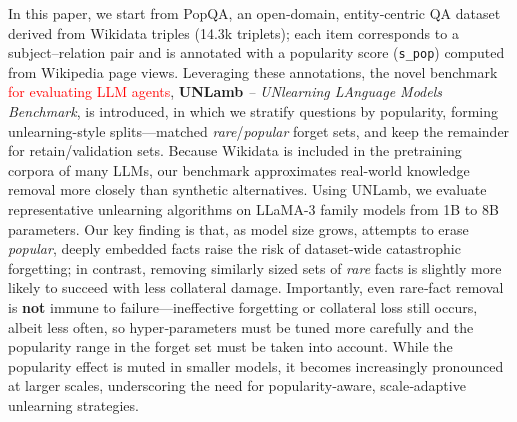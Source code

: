 \documentclass[sigconf,anonymous]{aamas}
\begin{document}


In this paper, we start from PopQA, an open‑domain, entity‑centric QA dataset derived from Wikidata triples (14.3k triplets); each item corresponds to a subject–relation pair and is annotated with a popularity score (\texttt{s\_pop}) computed from Wikipedia page views.  
Leveraging these annotations, the novel benchmark \textcolor{red}{for evaluating LLM agents}, \textbf{UNLamb} \textit{-- UNlearning LAnguage Models Benchmark}, is introduced, in which we stratify questions by popularity, forming unlearning-style splits—matched \emph{rare}/\emph{popular} forget sets, and keep the remainder for retain/validation sets. 
Because Wikidata is included in the pretraining corpora of many LLMs, our benchmark approximates real-world knowledge removal more closely than synthetic alternatives. Using UNLamb, we evaluate representative unlearning algorithms on LLaMA-3 family models from 1B to 8B parameters.  
Our key finding is that, as model size grows, attempts to erase \emph{popular}, deeply embedded facts raise the risk of dataset‑wide catastrophic forgetting; in contrast, removing similarly sized sets of \emph{rare} facts is slightly more likely to succeed with less collateral damage.  
Importantly, even rare‑fact removal is \textbf{not} immune to failure—ineffective forgetting or collateral loss still occurs, albeit less often, so hyper‑parameters must be tuned more carefully and the popularity range in the forget set must be taken into account.  
While the popularity effect is muted in smaller models, it becomes increasingly pronounced at larger scales, underscoring the need for popularity‑aware, scale‑adaptive unlearning strategies.
\end{document}
